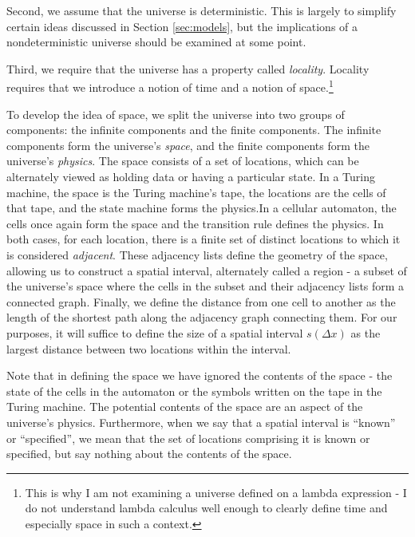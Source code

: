 \documentclass[12pt]{article}
\theoremstyle{definition}
\begin{document}
Second, we assume that the universe is deterministic. This is largely to
simplify certain ideas discussed in Section \ref{sec:models}, but the
implications of a nondeterministic universe should be examined at some point.

Third, we require that the universe has a property called \textit{locality}.
Locality requires that we introduce a notion of time and a notion of
space.\footnote{This is why I am not examining a universe defined on a lambda
expression - I do not understand lambda calculus well enough to clearly define
time and especially space in such a context.}

To develop the idea of space, we split the universe into two groups of
components: the infinite components and the finite components. The infinite
components form the universe's \textit{space}, and the finite components form
the universe's \textit{physics}. The space consists of a set of locations, which
can be alternately viewed as holding data or having a particular state. In a
Turing machine, the space is the Turing machine's tape, the locations are the
cells of that tape, and the state machine forms the physics.\footnotemark In a
cellular automaton, the cells once again form the space and the transition rule
defines the physics. In both cases, for each location, there is a finite set of
distinct locations to which it is considered \textit{adjacent}. These adjacency
lists define the geometry of the space, allowing us to construct a spatial
interval, alternately called a region - a subset of the universe's space where
the cells in the subset and their adjacency lists form a connected graph.
Finally, we define the distance from one cell to another as the length of the
shortest path along the adjacency graph connecting them. For our purposes, it
will suffice to define the size of a spatial interval \(s(\Delta x)\) as the
largest distance between two locations within the interval.


Note that in defining the space we have ignored the contents of the space - the
state of the cells in the automaton or the symbols written on the tape in the
Turing machine. The potential contents of the space are an aspect of the
universe's physics. Furthermore, when we say that a spatial interval is
``known'' or ``specified'', we mean that the set of locations comprising it is
known or specified, but say nothing about the contents of the space.
\end{document}
